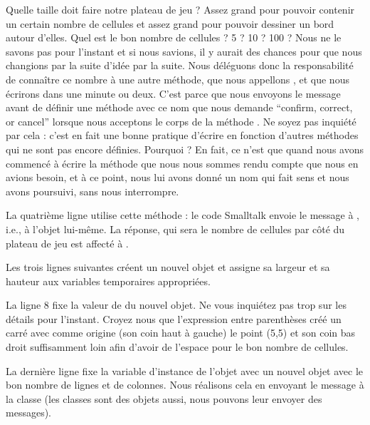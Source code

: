 \documentclass[a4paper,10pt,twoside]{book}
\begin{document}
Quelle taille doit faire notre plateau de jeu ? Assez grand pour pouvoir contenir un certain nombre de cellules et assez grand pour pouvoir dessiner un bord autour d'elles.
Quel est le bon nombre de cellules ? 5 ? 10 ? 100 ? Nous ne le savons pas pour l'instant et si nous savions, il y aurait des chances pour que nous changions par la suite d'idée par la suite. Nous déléguons donc la responsabilité de connaître ce nombre à une autre méthode, que nous appellons , et que nous écrirons dans une minute ou deux.
C'est parce que nous envoyons le message  avant de définir une méthode avec ce nom que \squeak nous demande ``confirm, correct, or cancel'' lorsque nous acceptons le corps de la méthode .
Ne soyez pas inquiété par cela : c'est en fait une bonne pratique d'écrire en fonction d'autres méthodes qui ne sont pas encore définies.
Pourquoi ? En fait, ce n'est que quand nous avons commencé à écrire la méthode  que nous nous sommes rendu compte que nous en avions besoin, et à ce point, nous lui avons donné un nom qui fait sens et nous avons poursuivi, sans nous interrompre.
 
La quatrième ligne utilise cette méthode : le code Smalltalk  envoie le message  à , i.e., à l'objet lui-même. La réponse, qui sera le nombre de cellules par côté du plateau de jeu est affecté à .

Les trois lignes suivantes créent un nouvel objet  et assigne sa largeur et sa hauteur aux variables temporaires appropriées.

La ligne 8 fixe la valeur de  du nouvel objet. Ne vous inquiétez pas trop sur les détails pour l'instant. Croyez nous que l'expression entre parenthèses créé un carré avec comme origine (\ie son coin haut à gauche) le point (5,5) et son coin bas droit suffisamment loin afin d'avoir de l'espace pour le bon nombre de cellules.

La dernière ligne fixe la variable d'instance  de l'objet  avec un nouvel objet  avec le bon nombre de lignes et de colonnes.
Nous réalisons cela en envoyant le message  à la classe  (les classes sont des objets aussi, nous pouvons leur envoyer des messages).
\end{document}
